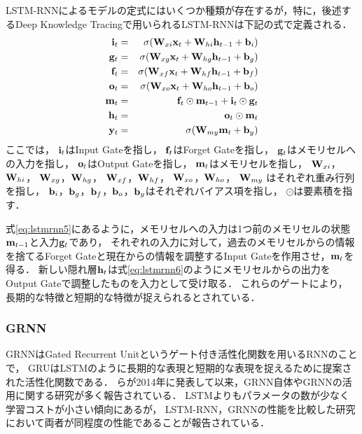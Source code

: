 LSTM-RNNによるモデルの定式にはいくつか種類が存在するが，特に，後述するDeep Knowledge Tracing\cite{piech2015deep}で用いられるLSTM-RNNは下記の式で定義される．
\begin{eqnarray}
\label{eq:lstmrnn1}
{\bf i}_t &=& \sigma({\bf W}_{xi}{\bf x}_t + {\bf W}_{hi}{\bf h}_{t-1} + {\bf b}_i) \\
\label{eq:lstmrnn2}
{\bf g}_t &=& \sigma({\bf W}_{xg}{\bf x}_t + {\bf W}_{hg}{\bf h}_{t-1} + {\bf b}_g) \\
\label{eq:lstmrnn3}
{\bf f}_t &=& \sigma({\bf W}_{xf}{\bf x}_t + {\bf W}_{hf}{\bf h}_{t-1} + {\bf b}_f) \\
\label{eq:lstmrnn4}
{\bf o}_t &=& \sigma({\bf W}_{xo}{\bf x}_t + {\bf W}_{ho}{\bf h}_{t-1} + {\bf b}_o) \\
\label{eq:lstmrnn5}
{\bf m}_t &=& {\bf f}_t \odot {\bf m}_{t-1} + {\bf i}_t \odot {\bf g}_t \\
\label{eq:lstmrnn6}
{\bf h}_t &=& {\bf o}_t \odot {\bf m}_t  \\
\label{eq:lstmrnn7}
{\bf y}_t &=& \sigma({\bf W}_{my} {\bf m}_t + {\bf b}_y) 
\end{eqnarray}
ここでは，
${\bf i}_t$はInput Gateを指し，
${\bf f}_t$はForget Gateを指し，
${\bf g}_t$はメモリセルへの入力を指し，
${\bf o}_t$はOutput Gateを指し，
${\bf m}_t$はメモリセルを指し，
${\bf W}_{xi}$，${\bf W}_{hi}$，
${\bf W}_{xg}$，${\bf W}_{hg}$，
${\bf W}_{xf}$，${\bf W}_{hf}$，
${\bf W}_{xo}$，${\bf W}_{ho}$，
${\bf W}_{my}$
はそれぞれ重み行列を指し，
${\bf b}_i$，${\bf b}_g$，${\bf b}_f$，${\bf b}_o$，${\bf b}_y$はそれぞれバイアス項を指し，
$\odot$は要素積を指す．

式\ref{eq:lstmrnn5}にあるように，メモリセルへの入力は1つ前のメモリセルの状態${\bf m}_{t-1}$と入力${\bf g}_t$であり，
それぞれの入力に対して，過去のメモリセルからの情報を捨てるForget Gateと現在からの情報を調整するInput Gateを作用させ，${\bf m}_t$を得る．
新しい隠れ層${\bf h}_t$は式\ref{eq:lstmrnn6}のようにメモリセルからの出力をOutput Gateで調整したものを入力として受け取る．
これらのゲートにより，
長期的な特徴と短期的な特徴が捉えられるとされている．

\subsubsection{GRNN}
GRNNはGated Recurrent Unit\cite{cho2014learning}というゲート付き活性化関数を用いるRNNのことで，
GRUはLSTMのように長期的な表現と短期的な表現を捉えるために提案された活性化関数である．
\cite{cho2014learning}らが2014年に発表して以来，GRNN自体やGRNNの活用に関する研究が多く報告されている\cite{chung2014empirical, zaremba2015empirical, chung2015gated, karpathy2015visualizing, biswassentiment, pezeshki2015sequence}．
LSTMよりもパラメータの数が少なく学習コストが小さい傾向にあるが，
LSTM-RNN，GRNNの性能を比較した研究\cite{chung2014empirical, zaremba2015empirical}において両者が同程度の性能であることが報告されている．

